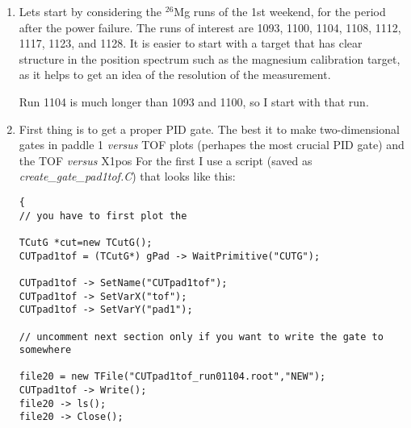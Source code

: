 \documentclass[11pt]{report}
\begin{document}
\begin{enumerate}
The other ODB directory that used to be important, where all the lineshape corrections terms used to
be, now only has 14 entries and looks like this:

\begin{verbatim}
[local:Default:S]main>pwd
/Analyzer/Parameters/main
[local:Default:S]main>ls
x1_driftt_low                   6100
x1_driftt_hi                    8050
x2_driftt_low                   6100
u1_driftt_low                   6100
u2_driftt_low                   6100
x2_driftt_hi                    8050
u2_driftt_hi                    8050
u1_driftt_hi                    8050
lowtof                          2000
hitof                           7000
lowpad1                         0
lowpad2                         0
hipad1                          4096
hipad2                          4096
\end{verbatim}

Normally it should not be necessary for you to change anything in the ODB (but that does not mean
that you should blindly trust it either).

\item Lets start by considering the $^{26}$Mg runs of the 1st weekend, for the period after the power failure.
The runs of interest are 1093, 1100, 1104, 1108, 1112, 1117, 1123, and 1128. It is easier to start with a target 
that has clear structure in the position spectrum such as the magnesium calibration target, as it helps to
get an idea of the resolution of the measurement.

Run 1104 is much longer than 1093 and 1100, so I start with that run.
 
\item First thing is to get a proper PID gate.  The best it to make two-dimensional gates in 
paddle 1 {\it versus} TOF plots (perhapes the most crucial PID gate) and 
the TOF {\it versus} X1pos
%
For the first I use a script  (saved as {\it create\_gate\_pad1tof.C}) that looks like this:
\begin{verbatim}
{
// you have to first plot the

TCutG *cut=new TCutG();
CUTpad1tof = (TCutG*) gPad -> WaitPrimitive("CUTG");

CUTpad1tof -> SetName("CUTpad1tof"); 
CUTpad1tof -> SetVarX("tof");
CUTpad1tof -> SetVarY("pad1");

// uncomment next section only if you want to write the gate to somewhere

file20 = new TFile("CUTpad1tof_run01104.root","NEW");
CUTpad1tof -> Write();
file20 -> ls();
file20 -> Close();


\end{verbatim}
\end{enumerate}
\end{document}
